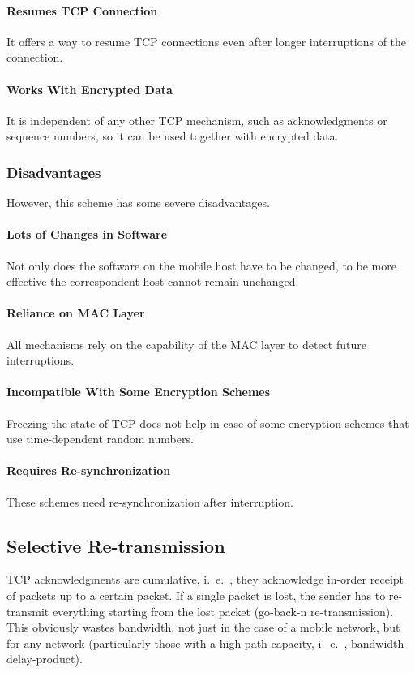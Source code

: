 \paragraph*{Resumes TCP Connection}
It offers a way to resume TCP connections even after longer interruptions of the connection. 

\paragraph*{Works With Encrypted Data}
It is independent of any other TCP mechanism, such as acknowledgments or sequence numbers, so it can be used together with encrypted data.

\subsubsection{Disadvantages}
However, this scheme has some severe {disadvantages}. 

\paragraph*{Lots of Changes in Software}
Not only does the software on the mobile host have to be changed, to be more effective the correspondent host cannot remain unchanged. 

\paragraph*{Reliance on MAC Layer}
All mechanisms rely on the capability of the MAC layer to detect future interruptions. 

\paragraph*{Incompatible With Some Encryption Schemes}
Freezing the state of TCP does not help in case of some encryption schemes that use time-dependent random numbers. 

\paragraph*{Requires Re-synchronization}
These schemes need re-synchronization after interruption.



\subsection{Selective Re-transmission}
TCP acknowledgments are cumulative, i.\ e.\ , they acknowledge in-order receipt of packets up to a certain packet. If a single packet is lost, the sender has to re-transmit everything starting from the lost packet (go-back-n re-transmission). This obviously wastes bandwidth, not just in the case of a mobile network, but for any network (particularly those with a high path capacity, i.\ e.\ , bandwidth delay-product).


